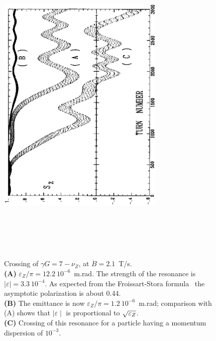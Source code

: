 \begin{figure}[H]
\centerline{\includegraphics[height=16cm,width=8cm,angle=-90]{FigC6-4.ps}}
\vspace{-.2cm}
\caption[FigC64]{\label{figC64} \small
Crossing of	$ \gamma G=7-\nu_ Z	$, at $	\dot  B=2.1	$~T/s. \\
\textbf{(A)}	$ \varepsilon_ Z/\pi =12.2\	10^{-6}	$~m.rad. The strength of the resonance is
$\mid \varepsilon \mid =3.3~10^{-4}	$.
As expected	from the Froissart-Stora formula~\cite{Froissart} the asymptotic	polarization is	about
0.44. \\
\textbf{(B)}	The	emittance is now $ \varepsilon_	Z/\pi =1.2\	10^{-6}	$~m.rad;
comparison with	(A)	shows that $\mid \varepsilon \mid$ is proportional to
$ \protect\sqrt{\varepsilon_Z}	$.	\\
\textbf{(C)}	Crossing of	this resonance for a particle having a momentum	dispersion of
$ 10^{-3} $.}
\end{figure}

\clearpage

\twocolumn

